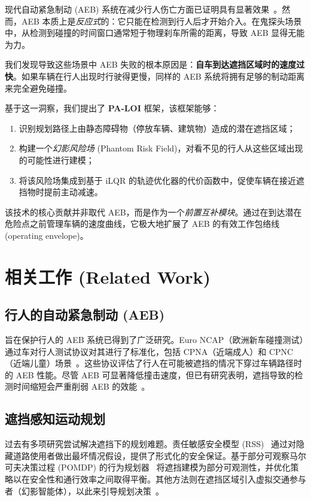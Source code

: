\documentclass[conference]{IEEEtran}
\begin{document}
现代自动紧急制动 (AEB) 系统在减少行人伤亡方面已证明具有显著效果~\cite{cicchino2022effects}。然而，AEB 本质上是\emph{反应式}的：它只能在检测到行人后才开始介入。在鬼探头场景中，从检测到碰撞的时间窗口通常短于物理刹车所需的距离，导致 AEB 显得无能为力。

我们发现导致这些场景中 AEB 失败的根本原因是：\textbf{自车到达遮挡区域时的速度过快}。如果车辆在行人出现时行驶得更慢，同样的 AEB 系统将拥有足够的制动距离来完全避免碰撞。

基于这一洞察，我们提出了 \textbf{PA-LOI} 框架，该框架能够：
\begin{enumerate}
    \item 识别规划路径上由静态障碍物（停放车辆、建筑物）造成的潜在遮挡区域；
    \item 构建一个\emph{幻影风险场} (Phantom Risk Field)，对看不见的行人从这些区域出现的可能性进行建模；
    \item 将该风险场集成到基于 iLQR 的轨迹优化器的代价函数中，促使车辆在接近遮挡物时提前主动减速。
\end{enumerate}

该技术的核心贡献并非取代 AEB，而是作为一个\emph{前置互补模块}。通过在到达潜在危险点之前管理车辆的速度曲线，它极大地扩展了 AEB 的有效工作包络线 (operating envelope)。

\section{相关工作 (Related Work)}

\subsection{行人的自动紧急制动 (AEB)}
旨在保护行人的 AEB 系统已得到了广泛研究。Euro NCAP（欧洲新车碰撞测试）通过车对行人测试协议对其进行了标准化，包括 CPNA（近端成人）和 CPNC（近端儿童）场景~\cite{euroncap2023}。这些协议评估了行人在可能被遮挡的情况下穿过车辆路径时的 AEB 性能。尽管 AEB 可显著降低撞击速度，但已有研究表明，遮挡导致的检测时间缩短会严重削弱 AEB 的效能~\cite{cicchino2022effects}。

\subsection{遮挡感知运动规划}
过去有多项研究尝试解决遮挡下的规划难题。责任敏感安全模型 (RSS)~\cite{shalev2017rss} 通过对隐藏道路使用者做出最坏情况假设，提供了形式化的安全保证。基于部分可观察马尔可夫决策过程 (POMDP) 的行为规划器~\cite{zhang2021pomdp} 将遮挡建模为部分可观测性，并优化策略以在安全性和通行效率之间取得平衡。其他方法则在遮挡区域引入虚拟交通参与者（幻影智能体），以此来引导规划决策~\cite{schratter2019occlusion}。
\end{document}
